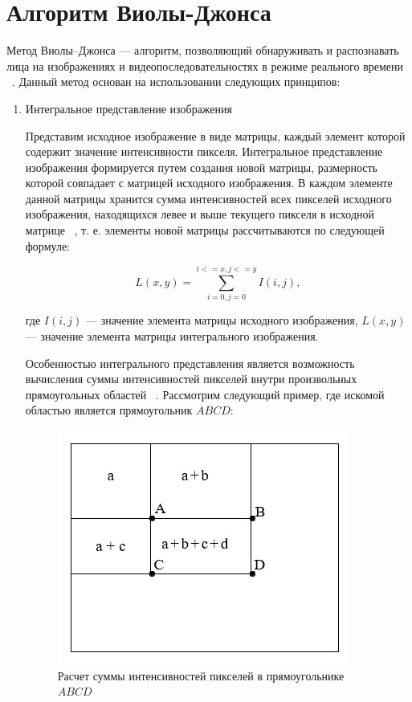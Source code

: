 \chapter{Алгоритм Виолы-Джонса}

Метод Виолы--Джонса --- алгоритм, позволяющий обнаруживать и распознавать лица на изображениях и видеопоследовательностях в режиме реального времени ~\cite{viola}. Данный метод основан на использовании следующих принципов:
\begin{enumerate}[label=\arabic*.]
    \item Интегральное представление изображения

    Представим исходное изображение в виде матрицы, каждый элемент которой содержит значение интенсивности пикселя. Интегральное представление изображения формируется путем создания новой матрицы, размерность которой совпадает с матрицей исходного изображения. В каждом элементе данной матрицы хранится сумма интенсивностей всех пикселей исходного изображения, находящихся левее и выше текущего пикселя в исходной матрице ~\cite{tomsk}, т. е. элементы новой матрицы рассчитываются по следующей формуле:
    
    \begin{equation}
        L(x,y) = \sum_{i=0, j=0}^{i<=x, j<=y} I(i,j),
    \end{equation}

    где $I(i, j)$ --- значение элемента матрицы исходного изображения, $L(x,y)$ --- значение элемента матрицы интегрального изображения.

    Особенностью интегрального представления является возможность вычисления суммы интенсивностей пикселей внутри произвольных прямоугольных областей ~\cite{tomsk}. Рассмотрим следующий пример, где искомой областью является прямоугольник $ABCD$:

    \begin{figure}[h]
	\centering
	\includegraphics[height=0.25\textheight]{img/integral.jpg}
	\caption{Расчет суммы интенсивностей пикселей в прямоугольнике $ABCD$}
    \label{img:integral}
    \end{figure}


\end{enumerate}
